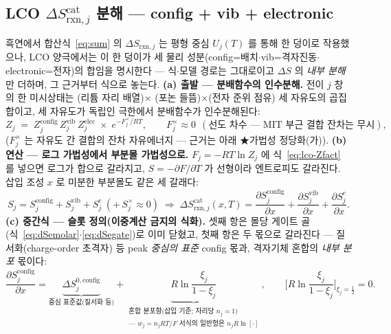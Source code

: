 \documentclass[11pt,a4paper]{article}
\newcommand{\rxn}{\mathrm{rxn}}
\begin{document}
\subsection{LCO $\Delta S_{\rxn,j}^\mathrm{cat}$ 분해 — config + vib + electronic}\label{sec:lco-decomp}
흑연에서 합산식~\eqref{eq:sum} 의 $\Delta S_{\rxn,j}$ 는 평형 중심 $U_j(T)$ 를 통해 한 덩이로 작용했으나, LCO 양극에서는 이 한 덩이가 세 물리 성분(config=배치$\cdot$vib=격자진동$\cdot$electronic=전자)의 합임을 명시한다 — 식$\cdot$모델 경로는 그대로이고 $\Delta S$ 의 \emph{내부 분해}만 더하며, 그 근거부터 식으로 놓는다. \textbf{(a) 출발 — 분배함수의 인수분해.} 전이 $j$ 창의 한 미시상태는 (리튬 자리 배열)$\times$
(포논 들뜸)$\times$(전자 준위 점유) 세 자유도의 곱집합이고, 세 자유도가 독립인 극한에서 분배함수가
인수분해된다:
\begin{equation}
Z_j\;=\;Z_j^\mathrm{config}\,Z_j^\mathrm{vib}\,Z_j^\mathrm{elec}\;\times\;e^{-F_j^{\times}/RT},
\qquad F_j^{\times}\approx0\ \ (\text{선도 차수 — MIT 부근 결합 잔차는 무시}),
\label{eq:lco-Zfact}
\end{equation}
($F_j^{\times}$ 는 자유도 간 결합의 잔차 자유에너지 — 근거는 아래 ★가법성 정당화(가)). \textbf{(b) 연산 — 로그
가법성에서 부분몰 가법성으로.} $F_j=-RT\ln Z_j$ 에 식~\eqref{eq:lco-Zfact} 를 넣으면 로그가 합으로
갈라지고, $S=-\partial F/\partial T$ 가 선형이라 엔트로피도 갈라진다. 삽입 조성 $x$ 로 미분한 부분몰도
같은 세 갈래다:
\begin{equation}
S_j=S_j^\mathrm{config}+S_j^\mathrm{vib}+S_j^{e}\ (+\,S_j^{\times}\!\approx\!0)
\;\Longrightarrow\;
\Delta S_{\rxn,j}^\mathrm{cat}(x,T)=\frac{\partial S_j^\mathrm{config}}{\partial x}
+\frac{\partial S_j^\mathrm{vib}}{\partial x}
+\frac{\partial S_j^{e}}{\partial x}.
\label{eq:lco-Sadd}
\end{equation}
\textbf{(c) 중간식 — 슬롯 정의(이중계산 금지의 식화).} 셋째 항은 몰당 게이트 골
(식~\eqref{eq:dSemolar}$\cdot$\eqref{eq:dSegate})로 이미 닫혔고, 첫째 항은 두 몫으로 갈라진다 —
질서화(charge-order 초격자) 등 peak \emph{중심의 표준} config 몫과, 격자기체 혼합의 \emph{내부 분포}
몫이다:
\begin{equation}
\frac{\partial S_j^\mathrm{config}}{\partial x}
=\underbrace{\Delta S_j^{0,\mathrm{config}}}_{\text{중심 표준값(질서화 등)}}
+\underbrace{R\ln\frac{\xi_j}{1-\xi_j}}_{\substack{\text{혼합 분포항(삽입 기준; 자리당 }n_j{=}1\text{)}\\ \text{— }w_j{=}n_jRT/F\text{ 서식의 일반형은 }n_jR\ln[\cdot]}},
\qquad
\Big[R\ln\frac{\xi_j}{1-\xi_j}\Big]_{\xi_j=\frac12}=0.
\label{eq:lco-configsplit}
\end{equation}
\end{document}
